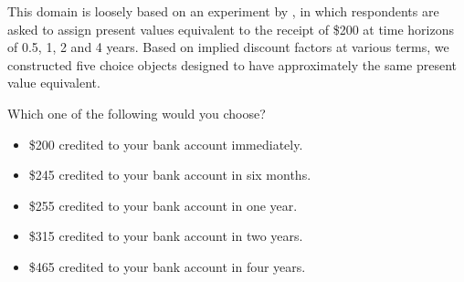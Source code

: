 
This domain is loosely based on an experiment by , in which respondents are asked to assign present values equivalent to the receipt of \$200 at time horizons of 0.5, 1, 2 and 4 years.
Based on implied discount factors at various terms, we constructed five choice objects designed to have approximately the same present value equivalent.

\begin{tcolorbox}
Which one of the following would you choose?

\begin{itemize}
	\setlength\itemsep{-5pt}
	\item \$200 credited to your bank account immediately.
	\item \$245 credited to your bank account in six months.
	\item \$255 credited to your bank account in one year.
	\item \$315 credited to your bank account in two years.
	\item \$465 credited to your bank account in four years.
\end{itemize}
\end{tcolorbox}
